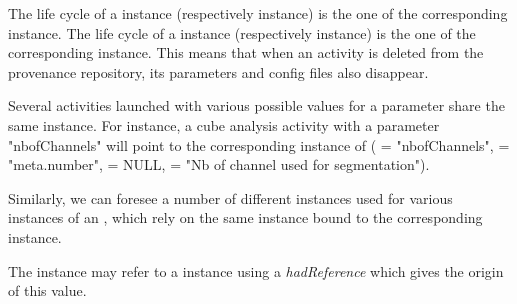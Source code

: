 The life cycle of a  instance (respectively  instance) is the one of the corresponding  instance. 
The life cycle of a  instance (respectively  instance) is the one of the corresponding  instance. 
This means that when an activity is deleted from the provenance repository, its parameters and config files also disappear.

Several activities launched with various possible values for a parameter share the same  instance. 
For instance, a cube analysis activity with a parameter "nbofChannels" will point to the corresponding instance of  ( = "nbofChannels",  = "meta.number",  = NULL,  = "Nb of channel used for segmentation"). 

Similarly, we can foresee a number of different  instances used for various instances of an , which rely on the same  instance bound to the corresponding  instance. 


The  instance may refer to a  instance using a \textit{hadReference} which gives the origin of this value. 
